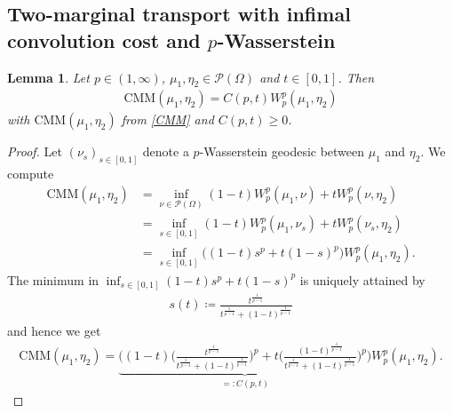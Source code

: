 \documentclass[10pt,a4paper]{amsart}
\newtheorem{lma}[thm]{Lemma}
\begin{document}
\subsection{Two-marginal transport with infimal convolution cost and $p$-Wasserstein}
\begin{lma}\label{cMMW_plma}
	Let $p\in(1,\infty)$, $\mu_1,\eta_2\in\mathcal P(\Omega)$ and $t\in[0,1]$. Then
	\begin{gather*}
		\text{CMM}(\mu_1,\eta_2)=C(p,t)W_p^p(\mu_1,\eta_2)
	\end{gather*}
	with $\text{CMM}(\mu_1,\eta_2)$ from \eqref{CMM} and $C(p,t)\geq 0$.
\end{lma}
\begin{proof}
	Let $(\nu_s)_{s\in[0,1]}$ denote a $p$-Wasserstein geodesic between $\mu_1$ and $\eta_2$.
	We compute
	\begin{align*}
		\text{CMM}(\mu_1,\eta_2)&=\inf_{\nu\in \mathcal P(\Omega)}(1-t)W_p^p(\mu_1,\nu)+tW_p^p(\nu,\eta_2)\\
		&=\inf_{s\in[0,1]}(1-t)W_p^p(\mu_1,\nu_s)+tW_p^p(\nu_s,\eta_2)\\
		&=\inf_{s\in[0,1]}\big((1-t)s^p+t(1-s)^p\big)W_p^p(\mu_1,\eta_2).
	\end{align*}
	The minimum in $\inf_{s\in[0,1]}(1-t)s^p+t(1-s)^p$ is uniquely attained by
	\begin{gather*}
		s(t)\coloneqq\frac{t^{\frac{1}{p-1}}}{t^{\frac{1}{p-1}}+(1-t)^{\frac{1}{p-1}}}
	\end{gather*}
	and hence we get
	\begin{gather*}
		\text{CMM}(\mu_1,\eta_2)=\underbrace{\Bigg((1-t)\Big(\frac{t^{\frac{1}{p-1}}}{t^{\frac{1}{p-1}}+(1-t)^{\frac{1}{p-1}}}\Big)^p+t\Big(\frac{(1-t)^{\frac{1}{p-1}}}{t^{\frac{1}{p-1}}+(1-t)^{\frac{1}{p-1}}}\Big)^p\Bigg)}_{=:C(p,t)}W_p^p(\mu_1,\eta_2).
	\end{gather*}
\end{proof}
\end{document}
